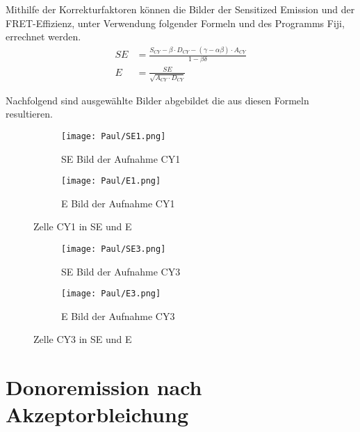 Mithilfe der Korrekturfaktoren können die Bilder der Sensitized Emission und der FRET-Effizienz, unter Verwendung folgender Formeln und des Programms Fiji, errechnet werden.
\begin{align}
    SE &= \frac{S_{CY} - \beta \cdot D_{CY} - (\gamma -\alpha \beta)\cdot A_{CY}}{1 - \beta \delta} \\
    E &= \frac{SE}{\sqrt{A_{CY} \cdot D_{CY}}}
\end{align}

Nachfolgend sind ausgewählte Bilder abgebildet die aus diesen Formeln resultieren.

\begin{figure}[h]
    \centering
    \begin{subfigure}[]{0.45\textwidth}
        \centering
        \texttt{[image: Paul/SE1.png]}
        \caption{SE Bild der Aufnahme CY1}
    \end{subfigure}
    \hfill 
    \begin{subfigure}[]{0.45\textwidth}
        \centering
        \texttt{[image: Paul/E1.png]}
        \caption{E Bild der Aufnahme CY1}
    \end{subfigure}
    \caption{Zelle CY1 in SE und E}
\end{figure}

\begin{figure}[h]
    \centering
    \begin{subfigure}[]{0.45\textwidth}
        \centering
        \texttt{[image: Paul/SE3.png]}
        \caption{SE Bild der Aufnahme CY3}
    \end{subfigure}
    \hfill 
    \begin{subfigure}[]{0.45\textwidth}
        \centering
        \texttt{[image: Paul/E3.png]}
        \caption{E Bild der Aufnahme CY3}
    \end{subfigure}
    \caption{Zelle CY3 in SE und E}
\end{figure}

\newpage
\section{Donoremission nach Akzeptorbleichung}
